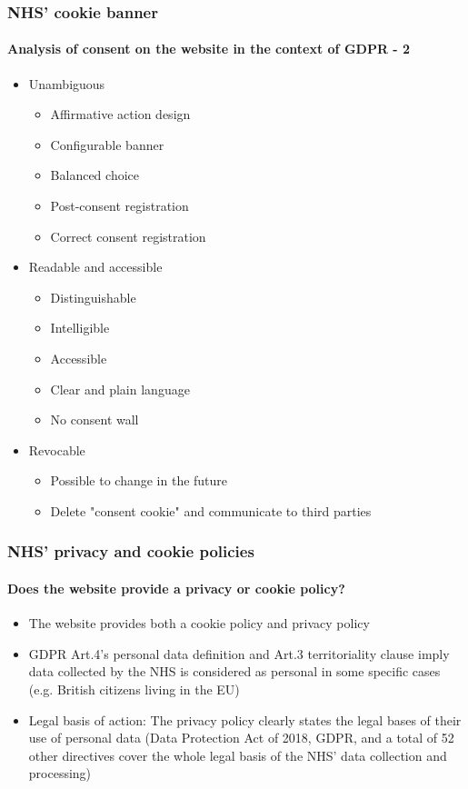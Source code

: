 \documentclass[aspectratio=43]{beamer}
\begin{document}
\begin{frame}
    \frametitle{NHS' cookie banner}
    \framesubtitle{Analysis of consent on the website in the context of GDPR - 2}
    \begin{itemize}
        \item Unambiguous
        \begin{itemize}
            \item Affirmative action design
            \item Configurable banner
            \item Balanced choice
            \item Post-consent registration
            \item Correct consent registration
        \end{itemize}
        \item Readable and accessible
        \begin{itemize}
            \item Distinguishable
            \item Intelligible
            \item Accessible
            \item Clear and plain language
            \item No consent wall
        \end{itemize}
        \item Revocable
        \begin{itemize}
            \item Possible to change in the future
            \item Delete "consent cookie" and communicate to third parties
        \end{itemize}
    \end{itemize}
\end{frame}


\begin{frame}
    \frametitle{NHS' privacy and cookie policies}
    \framesubtitle{Does the website provide a privacy or cookie policy?}
    \begin{itemize}
        \item The website provides both a cookie policy and privacy policy\newline
        \item GDPR Art.4's personal data definition and Art.3 territoriality clause imply data collected by the NHS is considered as personal in some specific cases (e.g. British citizens living in the EU)\newline
        \item Legal basis of action: The privacy policy clearly states the legal bases of their use of personal data (Data Protection Act of 2018, GDPR, and a total of 52 other directives cover the whole legal basis of the NHS' data collection and processing)
    \end{itemize}
\end{frame}
\end{document}
